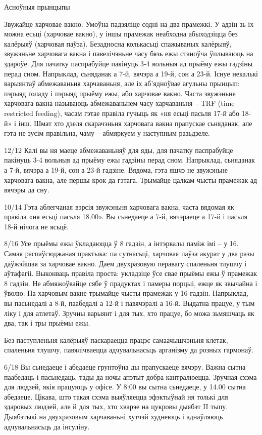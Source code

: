 Асноўныя прынцыпы

Звужайце харчовае вакно. 
Умоўна падзяліце содні на два прамежкі. У адзін зь іх можна есьці (харчовае вакно), у іншы прамежак неабходна абыходзіцца без калёрыяў (харчовая паўза). Безадносна колькасьці спажываных калёрыяў, звужэньне харчовага вакна і павелічэньне часу бязь ежы станоўча ўплываюць на здароўе.
Для пачатку паспрабуйце пакінуць 3-4 вольныя ад прыёму ежы гадзіны перад сном. Напрыклад, сьняданак а 7-й, вячэра а 19-й, сон а 23-й.
Існуе некалькі варыянтаў абмежаваньня харчаваньня, але іх аб'ядноўвае агульны прынцып: пэрыяд голаду і пэрыяд прыёму ежы, або харчовае вакно. Часта звужэньне харчовага вакна называюць абмежаваньнем часу харчаваньня – TRF (time restricted feeding), часам гэтае правіла гучыць як «ня есьці пасьля 17-й або 18-й» і інш. Шмат хто дзеля скарачэньня харчовага вакна прапускае сьняданак, але гэта не зусім правільна, чаму – абмяркуем у наступным разьдзеле.

12/12
Калі вы ня маеце абмежаваньняў для яды, для пачатку паспрабуйце пакінуць 3-4 вольныя ад прыёму ежы гадзіны перад сном. Напрыклад, сьняданак а 7-й, вячэра а 19-й, сон а 23-й гадзіне. Вядома, гэта яшчэ не звужэньне харчовага вакна, але першы крок да гэтага. Трымайце цалкам чысты прамежак ад вячэры да сну.

10/14
Гэта аблегчаная вэрсія звужэньня харчовага вакна, часта вядомая як правіла «ня есьці пасьля 18.00». Вы сьнедаеце а 7-й, вячэраеце а 17-й і пасьля 18-й нічога не ясьцё.

8/16
Усе прыёмы ежы ўкладаюцца ў 8 гадзін, а інтэрвалы паміж імі – у 16. Самая распаўсюджаная практыка: па сутнасьці, харчовая паўза акурат у два разы даўжэйшая за харчовае вакно. Даем двухразовую перавагу спаленьня тлушчу і аўтафагіі. Выконваць правіла проста: укладзіце ўсе свае прыёмы ежы ў прамежак 8 гадзін. Не абмяжоўвайце сябе ў прадуктах і памеры порцыі, ежце як звычайна і ўволю. Па харчовым вакне трымайце чысты прамежак у 16 гадзін. Напрыклад, вы пасьнедалі а 8-й, паабедалі а 12-й і павячэралі а 16-й. Выдатна працуе, у тым ліку і для атлетаў. Зручны варыянт і для тых, хто працуе, бо можа зьмяшчаць як два, так і тры прыёмы ежы.

Без паступленьня калёрыяў паскараецца працэс самаачышчэньня клетак, спаленьня тлушчу, павялічваецца адчувальнасьць арганізму да розных гармонаў.

6/18
Вы сьнедаеце і абедаеце грунтоўна ды прапускаеце вячэру. Важна сытна паабедаць і пасьнедаць, тады да ночы апэтыт добра кантралюецца. Зручная схэма для людзей, якія працуюць у офісе. У 8:00 вы сытна сьнедаеце, у 14.00 сытна абедаеце. Цікава, што такая схэма выяўляецца эфэктыўнай ня толькі для здаровых людзей, але й для тых, хто хварэе на цукровы дыябэт II тыпу. Дыябэтыкі на двухразовым харчаваньні хутчэй худнеюць і аднаўляюць адчувальнасьць да інсуліну.

